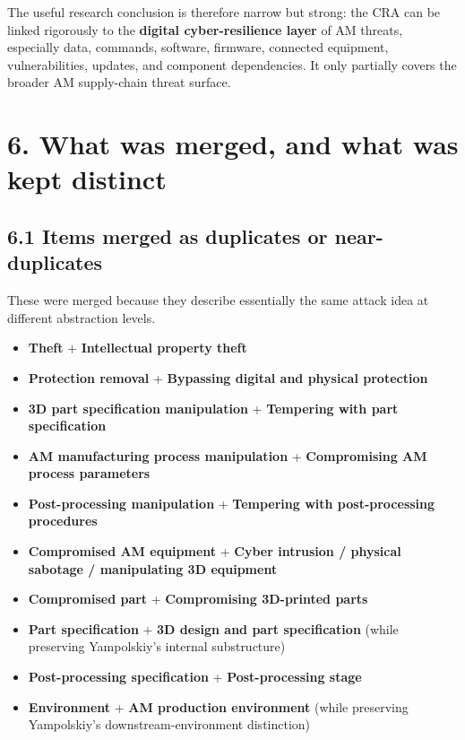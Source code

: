 \documentclass[10pt,a4paper,oneside]{report}
\begin{document}
The useful research conclusion is therefore narrow but strong: the CRA can be linked rigorously to the \textbf{digital cyber-resilience layer} of AM threats, especially data, commands, software, firmware, connected equipment, vulnerabilities, updates, and component dependencies. It only partially covers the broader AM supply-chain threat surface.


\chapter{6. What was merged, and what was kept distinct}



\section{6.1 Items merged as duplicates or near-duplicates}


These were merged because they describe essentially the same attack idea at different abstraction levels.

\begin{itemize}
\item \textbf{Theft} + \textbf{Intellectual property theft}
\item \textbf{Protection removal} + \textbf{Bypassing digital and physical protection}
\item \textbf{3D part specification manipulation} + \textbf{Tempering with part specification}
\item \textbf{AM manufacturing process manipulation} + \textbf{Compromising AM process parameters}
\item \textbf{Post-processing manipulation} + \textbf{Tempering with post-processing procedures}
\item \textbf{Compromised AM equipment} + \textbf{Cyber intrusion / physical sabotage / manipulating 3D equipment}
\item \textbf{Compromised part} + \textbf{Compromising 3D-printed parts}
\item \textbf{Part specification} + \textbf{3D design and part specification} (while preserving Yampolskiy's internal substructure)
\item \textbf{Post-processing specification} + \textbf{Post-processing stage}
\item \textbf{Environment} + \textbf{AM production environment} (while preserving Yampolskiy's downstream-environment distinction)
\end{itemize}
\end{document}
